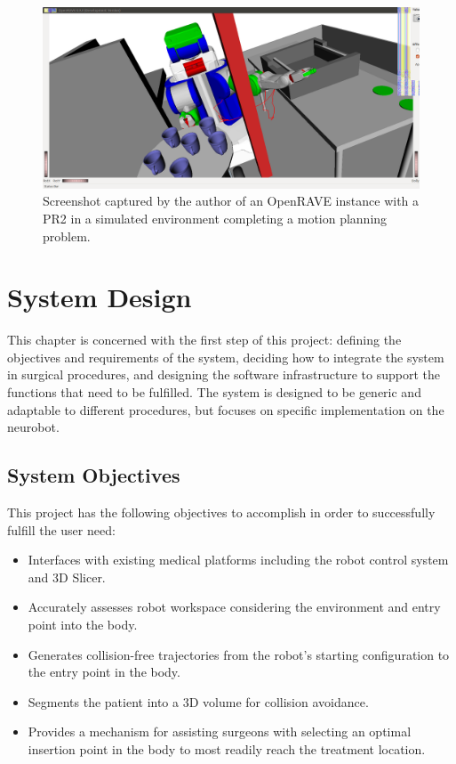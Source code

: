 \documentclass[12pt]{report}
\begin{document}
\begin{figure}[thpb]
	\centering
	\includegraphics[width=\textwidth]{images/openrave_pr2_planning.png}
    \caption{Screenshot captured by the author of an OpenRAVE instance with a PR2 in a simulated environment completing a motion planning problem.}
    \label{fig:openRAVEExample}
\end{figure}


\chapter{System Design}
This chapter is concerned with the first step of this project: defining the objectives and requirements of the system, deciding how to integrate the system in surgical procedures, and designing the software infrastructure to support the functions that need to be fulfilled. The system is designed to be generic and adaptable to different procedures, but focuses on specific implementation on the neurobot.


\section{System Objectives}
\label{sec:systemObjectives}
This project has the following objectives to accomplish in order to successfully fulfill the user need:

\begin{itemize}
\singlespacing
\item Interfaces with existing medical platforms including the robot control system and 3D Slicer.
\item Accurately assesses robot workspace considering the environment and entry point into the body.
\item Generates collision-free trajectories from the robot's starting configuration to the entry point in the body.
\item Segments the patient into a 3D volume for collision avoidance.
\item Provides a mechanism for assisting surgeons with selecting an optimal insertion point in the body to most readily reach the treatment location.
\end{itemize}
\end{document}
